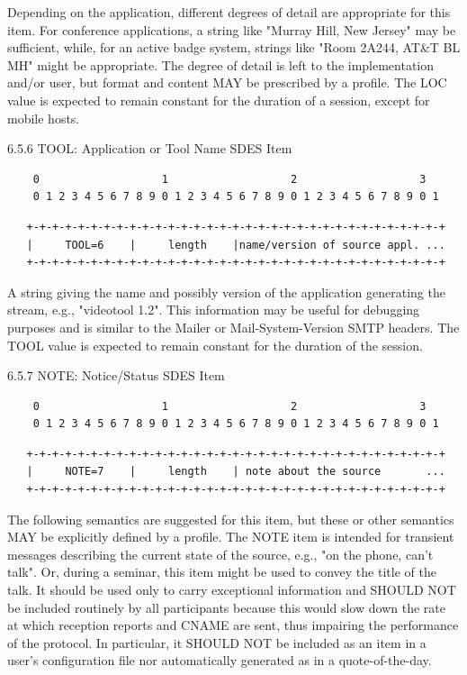 \documentclass{article}
\begin{document}
Depending on the application, different degrees of detail are appropriate for this item.  For conference applications, a string like "Murray Hill, New Jersey" may be sufficient, while, for an active badge system, strings like "Room 2A244, AT\&T BL MH" might be appropriate.  The degree of detail is left to the implementation and/or user, but format and content MAY be prescribed by a profile. The LOC value is expected to remain constant for the duration of a session, except for mobile hosts.

6.5.6 TOOL: Application or Tool Name SDES Item

\begin{verbatim}
    0                   1                   2                   3
    0 1 2 3 4 5 6 7 8 9 0 1 2 3 4 5 6 7 8 9 0 1 2 3 4 5 6 7 8 9 0 1
\end{verbatim}

\begin{verbatim}
   +-+-+-+-+-+-+-+-+-+-+-+-+-+-+-+-+-+-+-+-+-+-+-+-+-+-+-+-+-+-+-+-+
   |     TOOL=6    |     length    |name/version of source appl. ...
   +-+-+-+-+-+-+-+-+-+-+-+-+-+-+-+-+-+-+-+-+-+-+-+-+-+-+-+-+-+-+-+-+
\end{verbatim}

A string giving the name and possibly version of the application generating the stream, e.g., "videotool 1.2".  This information may be useful for debugging purposes and is similar to the Mailer or Mail-System-Version SMTP headers.  The TOOL value is expected to remain constant for the duration of the session.

6.5.7 NOTE: Notice/Status SDES Item

\begin{verbatim}
    0                   1                   2                   3
    0 1 2 3 4 5 6 7 8 9 0 1 2 3 4 5 6 7 8 9 0 1 2 3 4 5 6 7 8 9 0 1
\end{verbatim}

\begin{verbatim}
   +-+-+-+-+-+-+-+-+-+-+-+-+-+-+-+-+-+-+-+-+-+-+-+-+-+-+-+-+-+-+-+-+
   |     NOTE=7    |     length    | note about the source       ...
   +-+-+-+-+-+-+-+-+-+-+-+-+-+-+-+-+-+-+-+-+-+-+-+-+-+-+-+-+-+-+-+-+
\end{verbatim}

The following semantics are suggested for this item, but these or other semantics MAY be explicitly defined by a profile.  The NOTE item is intended for transient messages describing the current state of the source, e.g., "on the phone, can't talk".  Or, during a seminar, this item might be used to convey the title of the talk.  It should be used only to carry exceptional information and SHOULD NOT be included routinely by all participants because this would slow down the rate at which reception reports and CNAME are sent, thus impairing the performance of the protocol.  In particular, it SHOULD NOT be included as an item in a user's configuration file nor automatically generated as in a quote-of-the-day.
\end{document}
